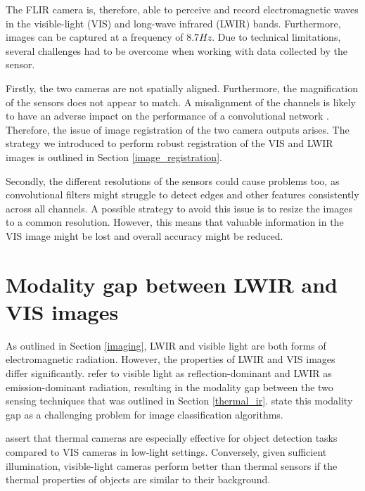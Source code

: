 \documentclass{l4proj}
\begin{document}
The FLIR camera is, therefore, able to perceive and record electromagnetic waves in the visible-light (VIS) and long-wave infrared (LWIR) bands. Furthermore, images can be captured at a frequency of $8.7 Hz$. Due to technical limitations, several challenges had to be overcome when working with data collected by the sensor.

Firstly, the two cameras are not spatially aligned. Furthermore, the magnification of the sensors does not appear to match. A misalignment of the channels is likely to have an adverse impact on the performance of a convolutional network \citep{chappelow_improving_2008}. Therefore, the issue of image registration of the two camera outputs arises. The strategy we introduced to perform robust registration of the VIS and LWIR images is outlined in Section \ref{image_registration}.

Secondly, the different resolutions of the sensors could cause problems too, as convolutional filters might struggle to detect edges and other features consistently across all channels. A possible strategy to avoid this issue is to resize the images to a common resolution. However, this means that valuable information in the VIS image might be lost and overall accuracy might be reduced. 


\section{Modality gap between LWIR and VIS images}
\label{modality}

As outlined in Section \ref{imaging}, LWIR and visible light are both forms of electromagnetic radiation. However, the properties of LWIR and VIS images differ significantly. \citet{sarfraz_deep_2017} refer to visible light as reflection-dominant and LWIR as emission-dominant radiation, resulting in the modality gap between the two sensing techniques that was outlined in Section \ref{thermal_ir}. \citet{choi_thermal_2012} state this modality gap as a challenging problem for image classification algorithms.

\citet{davis_background-subtraction_2007} assert that thermal cameras are especially effective for object detection tasks compared to VIS cameras in low-light settings. Conversely, given sufficient illumination, visible-light cameras perform better than thermal sensors if the thermal properties of objects are similar to their background.
\end{document}
